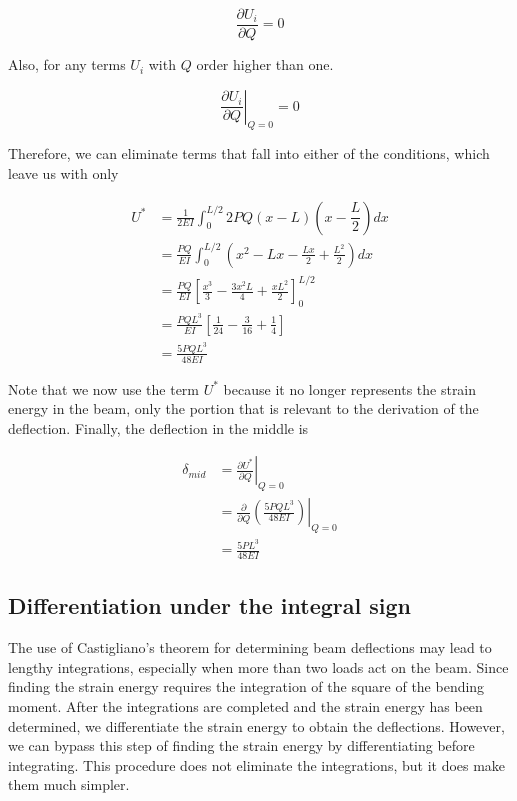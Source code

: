 \documentclass[
10pt,
a4paper,
openany,
svgnames,
]{book} %
\begin{document}
\begin{solution}
    \begin{equation*}
      \frac{\partial U_i}{\partial Q} = 0
    \end{equation*}

    Also, for any terms $U_i$ with $Q$ order higher than one.

    \begin{equation*}
      \left. \frac{\partial U_i}{\partial Q} \right|_{Q=0} = 0
    \end{equation*}

    Therefore, we can eliminate terms that fall into either of the conditions, which leave us with only

    \begin{align*}
      U^* &= \frac{1}{2EI} \int_0^{L/2} 2PQ(x-L)(x-\dfrac{L}{2}) dx \\
          &= \frac{PQ}{EI} \int_0^{L/2} (x^2 - Lx - \frac{Lx}{2} + \frac{L^2}{2}) dx \\
          &= \frac{PQ}{EI} \left[ \frac{x^3}{3} - \frac{3x^2L}{4} + \frac{xL^2}{2} \right]_0^{L/2} \\
          &= \frac{PQL^3}{EI} \left[ \frac{1}{24} - \frac{3}{16} + \frac{1}{4} \right] \\
          &= \frac{5PQL^3}{48EI}
    \end{align*}

    Note that we now use the term $U^*$ because it no longer represents the strain energy in the beam, only the portion that is relevant to the derivation of the deflection. Finally, the deflection in the middle is

    \begin{align*}
      \delta_{mid} &= \left. \frac{\partial U^*}{\partial Q} \right|_{Q=0} \\
                   &= \left. \frac{\partial}{\partial Q} \left( \frac{5PQL^3}{48EI} \right) \right|_{Q=0} \\
                   &= \frac{5PL^3}{48EI}
    \end{align*}
\end{solution}
\subsection{Differentiation under the integral sign}

The use of Castigliano’s theorem for determining beam deflections may lead to lengthy integrations, especially when more than two loads act on the beam. Since finding the strain energy requires the integration of the square of the bending moment. After the integrations are completed and the strain energy has been determined, we differentiate the strain energy to obtain the deflections. However, we can bypass this step of finding the strain energy by differentiating before integrating. This procedure does not eliminate the integrations, but it does make them much simpler.
\end{document}
